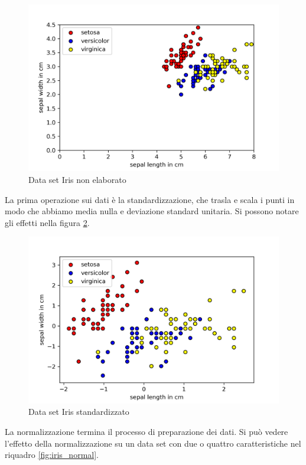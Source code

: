 \begin{figure}[ht]
    \centering
    \includegraphics[width=\linewidth]{gfx/iris/iris4features}
    \caption{Data set Iris non elaborato}
    \label{fig:iris_grezzi}
\end{figure}

La prima operazione sui dati è la standardizzazione, che trasla e scala 
i punti in modo che abbiamo media nulla e deviazione standard unitaria. 
Si possono notare gli effetti nella figura \ref{fig:iris_standard}. 

\begin{figure}[h!]
    \centering
    \includegraphics[width=\linewidth]{gfx/iris/irisscaled}
    \caption{Data set Iris standardizzato}
    \label{fig:iris_standard}
\end{figure}

La normalizzazione termina il processo di preparazione 
dei dati. Si può vedere l'effetto della normalizzazione su un data set 
con due o quattro caratteristiche nel riquadro \ref{fig:iris_normal}. 

